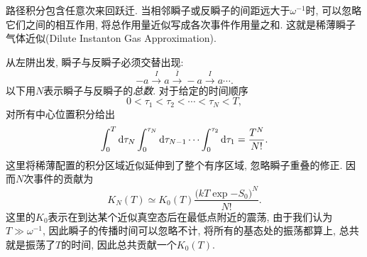 路径积分包含任意次来回跃迁. 当相邻瞬子或反瞬子的间距远大于$\omega^{-1}$时, 可以忽略它们之间的相互作用, 将总作用量近似写成各次事件作用量之和. 这就是稀薄瞬子气体近似(Dilute Instanton Gas Approximation).

从左阱出发, 瞬子与反瞬子必须交替出现:
\begin{equation}
    -a\xrightarrow{I}a\xrightarrow{\bar I}-a\xrightarrow{I}a\cdots.
\end{equation}
以下用$N$表示瞬子与反瞬子的\emph{总数}. 对于给定的时间顺序
\begin{equation}
    0<\tau_1<\tau_2<\cdots<\tau_N<T,
\end{equation}
对所有中心位置积分给出
\begin{equation}
    \int_0^T\mathrm d\tau_N\int_0^{\tau_N}\mathrm d\tau_{N-1}\cdots
    \int_0^{\tau_2}\mathrm d\tau_1=\frac{T^N}{N!}.
\end{equation}
这里将稀薄配置的积分区域近似延伸到了整个有序区域, 忽略瞬子重叠的修正. 因而$N$次事件的贡献为
\begin{equation}\label{ssb-many-instanton-kernel}
    K_N(T)\simeq K_0(T)\frac{\big(kT\exp{-S_0}\big)^N}{N!}.
\end{equation}
这里的$K_0$表示在到达某个近似真空态后在最低点附近的震荡, 由于我们认为$T\gg\omega^{-1}$, 因此瞬子的传播时间可以忽略不计, 将所有的基态处的振荡都算上, 总共就是振荡了$T$的时间, 因此总共贡献一个$K_0(T)$.

